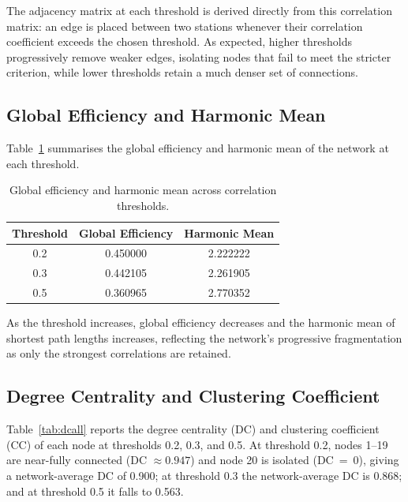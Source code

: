 \documentclass[11pt]{article}
\begin{document}
The adjacency matrix at each threshold is derived directly from this correlation matrix: an edge is
placed between two stations whenever their correlation coefficient exceeds the chosen threshold. As
expected, higher thresholds progressively remove weaker edges, isolating nodes that fail to meet the
stricter criterion, while lower thresholds retain a much denser set of connections.

\subsection{Global Efficiency and Harmonic Mean}
Table~\ref{tab:globaleff} summarises the global efficiency and harmonic mean of the network at each
threshold.

\begin{table}[H]
  \centering
  \caption{Global efficiency and harmonic mean across correlation thresholds.}
  \label{tab:globaleff}
  \begin{tabular}{@{}ccc@{}}
    \toprule
    \textbf{Threshold} & \textbf{Global Efficiency} & \textbf{Harmonic Mean} \\
    \midrule
    0.2 & 0.450000 & 2.222222 \\
    0.3 & 0.442105 & 2.261905 \\
    0.5 & 0.360965 & 2.770352 \\
    \bottomrule
  \end{tabular}
\end{table}

As the threshold increases, global efficiency decreases and the harmonic mean of shortest path
lengths increases, reflecting the network's progressive fragmentation as only the strongest
correlations are retained.

\subsection{Degree Centrality and Clustering Coefficient}
Table~\ref{tab:dcall} reports the degree centrality (DC) and clustering coefficient (CC) of each node
at thresholds 0.2, 0.3, and 0.5. At threshold 0.2, nodes 1--19 are near-fully connected (DC
$\approx 0.947$) and node 20 is isolated (DC~=~0), giving a network-average DC of 0.900; at threshold
0.3 the network-average DC is 0.868; and at threshold 0.5 it falls to 0.563.
\end{document}
